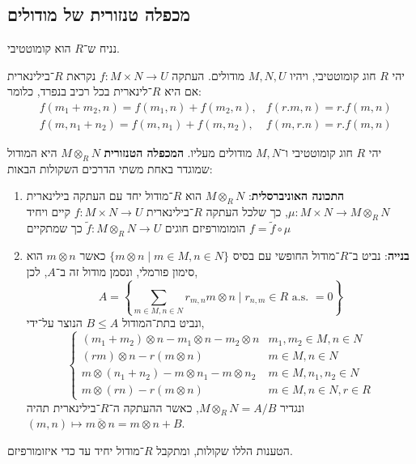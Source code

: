 \subsection{מכפלה טנזורית של מודולים}
נניח ש־$R$ הוא קומוטטיבי.
\begin{definition}
	יהי $R$ חוג קומוטטיבי, ויהיו $M, N, U$ מודולים.
	העתקה $f : M \times N \to U$ נקראת $R$־בילינארית אם היא $R$־לינארית בכל רכיב בנפרד, כלומר:
	\begin{align*}
		& f(m_1 + m_2, n) = f(m_1, n) + f(m_2, n),
		& f(r . m, n) = r . f(m, n) \\
		& f(m, n_1 + n_2) = f(m, n_1) + f(m, n_2),
		& f(m, r . n) = r . f(m, n)
	\end{align*}
\end{definition}
\begin{definition}
	יהי $R$ חוג קומוטטיבי ו־$M, N$ מודולים מעליו.
	\textbf{המכפלה הטנזורית} $M \otimes_R N$ היא המודול שמוגדר באחת משתי הדרכים השקולות הבאות:
	\begin{enumerate}
		\item \textbf{התכונה האוניברסלית}:
			$M \otimes_R N$ הוא $R$־מודול יחד עם העתקה בילינארית $\mu : M \times N \to M \otimes_R N$,
			כך שלכל העתקה $R$־בילינארית $f : M \times N \to U$ קיים ויחיד הומומורפיזם חוגים $\tilde{f} : M \otimes_R N \to U$ כך שמתקיים $f = \tilde{f} \circ \mu$
		\item \textbf{בנייה}:
			נביט ב־$R$־מודול החופשי עם בסיס $\{ m \otimes n \mid m \in M, n \in N \}$ כאשר $m \otimes n$ הוא סימון פורמלי, ונסמן מודול זה ב־$A$, לכן,
			\[
				A
				= \left\{ \sum_{m \in M, n \in N} r_{m, n} m \otimes n \mid r_{n, m} \in R \text{ a.s. } = 0 \right\}
			\]
			ונביט בתת־המודול $B \le A$ הנוצר על־ידי,
			\[
				\begin{cases}
					(m_1 + m_2) \otimes n - m_1 \otimes n - m_2 \otimes n & m_1, m_2 \in M, n \in N \\
					(r m) \otimes n - r (m \otimes n) & m \in M, n \in N \\
					m \otimes (n_1 + n_2) - m \otimes n_1 - m \otimes n_2 & m \in M, n_1, n_2 \in N \\
					m \otimes (r n) - r (m \otimes n) & m \in M, n \in N, r \in R
				\end{cases}
			\]
			ונגדיר $M \otimes_R N = A / B$, כאשר ההעתקה ה־$R$־בילינארית תהיה $(m, n) \mapsto \overline{m \otimes n} = m \otimes n + B$.
	\end{enumerate}
\end{definition}
\begin{proposition}
	הטענות הללו שקולות, ומתקבל $R$־מודול יחיד עד כדי איזומורפיזם.
\end{proposition}
